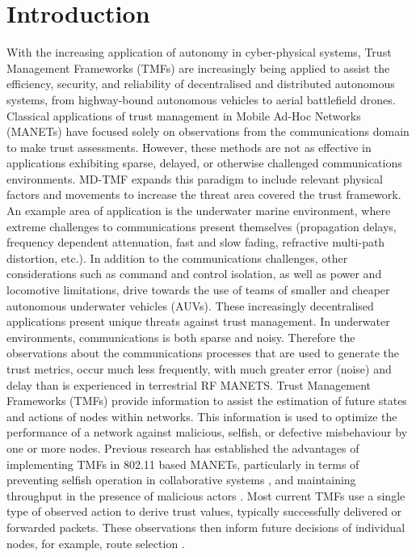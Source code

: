 \section{Introduction}
With the increasing application of autonomy in cyber-physical systems, Trust Management Frameworks (TMFs) are increasingly being applied to assist the efficiency, security, and reliability of decentralised and distributed autonomous systems, from highway-bound autonomous vehicles to aerial battlefield drones. 
Classical applications of trust management in Mobile Ad-Hoc Networks (MANETs) have focused solely on observations from the communications domain to make trust assessments. However, these methods are not as effective in applications exhibiting sparse, delayed, or otherwise challenged communications environments\cite{Pavan2015}. MD-TMF expands this paradigm to include relevant physical factors and movements to increase the threat area covered the trust framework. An example area of application is the underwater marine environment, where extreme challenges to communications present themselves (propagation delays, frequency dependent attenuation, fast and slow fading, refractive multi-path distortion, etc.).
In addition to the communications challenges, other considerations such as command and control isolation, as well as power and locomotive limitations, drive towards the use of teams of smaller and cheaper autonomous underwater vehicles (AUVs). These increasingly decentralised applications present unique threats against trust management. In underwater environments, communications is both sparse and noisy.
Therefore the observations about the communications processes that are used to generate the trust metrics, occur much less frequently, with much greater error (noise) and delay than is experienced in terrestrial RF MANETS.
Trust Management Frameworks (TMFs) provide information to assist the estimation of future states and actions of nodes within networks. This information is used to optimize the performance of a network against malicious, selfish, or defective misbehaviour by one or more nodes. Previous research has established the advantages of implementing TMFs in 802.11 based MANETs, particularly in terms of preventing selfish operation in collaborative systems \cite{Li2007}, and maintaining throughput in the presence of malicious actors \cite{Buchegger2002}. Most current TMFs use a single type of observed action to derive trust values, typically successfully delivered or forwarded packets. These observations then inform future decisions of individual nodes, for example, route selection \cite{Li2008}.
